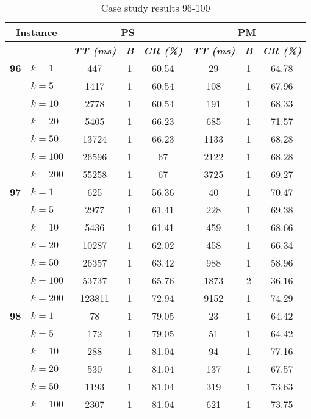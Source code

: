     \begin{table}[htbp]
    \caption{Case study results 96-100}
    \centering
    \begin{tabular}{|l|l|c|c|c|c|c|c|}
    \hline
    \multicolumn{ 2}{|c|}{\textbf{Instance}} & \multicolumn{ 3}{c|}{\textbf{PS}} & \multicolumn{ 3}{c|}{\textbf{PM}} \\ \hline
    \multicolumn{ 2}{|l|}{} & \textbf{\textit{TT (ms)}} & \textbf{\textit{B}} & \textbf{\textit{CR (\%)}} & \textbf{\textit{TT (ms)}} & \textbf{\textit{B}} & \textbf{\textit{CR (\%)}} \\ \hline
    \multicolumn{1}{|r|}{\textbf{96}} & $k=1$ & 447 & 1 & 60.54 & 29 & 1 & 64.78 \\ 
     & $k=5$ & 1417 & 1 & 60.54 & 108 & 1 & 67.96 \\ 
     & $k=10$ & 2778 & 1 & 60.54 & 191 & 1 & 68.33 \\ 
     & $k=20$ & 5405 & 1 & 66.23 & 685 & 1 & 71.57 \\ 
     & $k=50$ & 13724 & 1 & 66.23 & 1133 & 1 & 68.28 \\ 
     & $k=100$ & 26596 & 1 & 67 & 2122 & 1 & 68.28 \\ 
     & $k=200$ & 55258 & 1 & 67 & 3725 & 1 & 69.27 \\ \hline
    \multicolumn{1}{|r|}{\textbf{97}} & $k=1$ & 625 & 1 & 56.36 & 40 & 1 & 70.47 \\ 
     & $k=5$ & 2977 & 1 & 61.41 & 228 & 1 & 69.38 \\ 
     & $k=10$ & 5436 & 1 & 61.41 & 459 & 1 & 68.66 \\ 
     & $k=20$ & 10287 & 1 & 62.02 & 458 & 1 & 66.34 \\ 
     & $k=50$ & 26357 & 1 & 63.42 & 988 & 1 & 58.96 \\ 
     & $k=100$ & 53737 & 1 & 65.76 & 1873 & 2 & 36.16 \\ 
     & $k=200$ & 123811 & 1 & 72.94 & 9152 & 1 & 74.29 \\ \hline
    \multicolumn{1}{|r|}{\textbf{98}} & $k=1$ & 78 & 1 & 79.05 & 23 & 1 & 64.42 \\ 
     & $k=5$ & 172 & 1 & 79.05 & 51 & 1 & 64.42 \\ 
     & $k=10$ & 288 & 1 & 81.04 & 94 & 1 & 77.16 \\ 
     & $k=20$ & 530 & 1 & 81.04 & 137 & 1 & 67.57 \\ 
     & $k=50$ & 1193 & 1 & 81.04 & 319 & 1 & 73.63 \\ 
     & $k=100$ & 2307 & 1 & 81.04 & 621 & 1 & 73.75 \\ 

\end{tabular}
\end{table}
